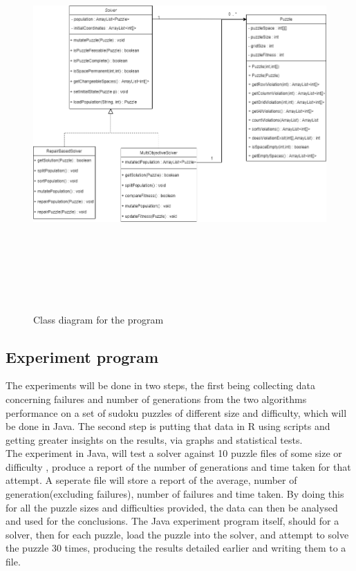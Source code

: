 \documentclass[a4paper,11pt]{article}
\begin{document}
\begin{figure}[H]
	\centering
	\includegraphics[height=15cm,width=18cm]{./Diagrams/classDiagram}
	\caption{Class diagram for the program}
\end{figure}

\subsection{Experiment program }
The experiments will be done in two steps, the first being collecting data concerning failures and number of generations from the two algorithms performance on a set of sudoku puzzles of different size and difficulty, which will be done in Java. The second step is putting that data in R using scripts and getting greater insights on the results, via graphs and statistical tests.\\ The experiment in Java, will test a solver against 10 puzzle files of some size or difficulty , produce a report of the number of generations and time taken for that attempt. A seperate file will store a report of the average, number of generation(excluding failures), number of failures and time taken. By doing this for all the puzzle sizes and difficulties provided, the data can then be analysed and used for the conclusions. The Java experiment program itself, should for a solver, then for each puzzle, load the puzzle into the solver, and attempt to solve the puzzle 30 times, producing the results detailed earlier and writing them to a file.    
\end{document}

